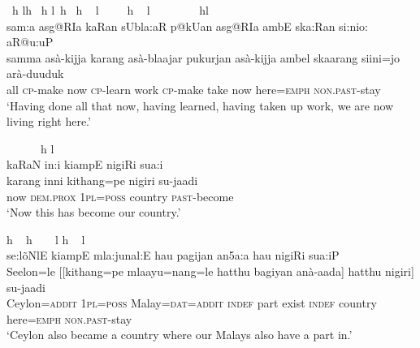 \ea \label{K051222nar04.23}
\gllll ~h \hspace{1.2cm}lh  ~h     \hspace{1cm}l~h ~h ~           l~~~~~h ~    \hspace{1cm}l ~~~~~~~~h\hspace{0.5cm}l \\
 sam:a asg@RI\texttoptiebar{\J\textctz}a kaRan sUbla:\J aR p@kU\J an asg@RI\J a ambE ska:Ran si:ni\J o:  aR@\dz u:\dz uP\\
 samma asà-kijja karang asà-blaajar pukurjan asà-kijja ambel skaarang siini=jo arà-duuduk\\
 all \textsc{cp}-make now \textsc{cp}-learn work \textsc{cp}-make take now    here=\textsc{emph} \textsc{non.past}-stay\\
`Having done all that now, having learned, having taken up work, we are now living right here.'\footnotemark
\z


\ea \label{K051222nar04.24}
\gllll ~ ~  ~             ~h     \hspace{1cm}l\\
 kaRaN in:i ki\dentt ampE nigiRi su\J a:\postalvd i\\
 karang inni kithang=pe nigiri su-jaadi\\
 now \textsc{dem.prox} \textsc{1pl}=\textsc{poss} country \textsc{past}-become\\
`Now this has become our country.'
\z


\ea \label{K051222nar04.25}
\gllll \hspace{1.1cm}h ~   \hspace{1.8cm}h ~         ~      \hspace{1.2cm}l \hspace{.6cm}h ~  \hspace{1.1cm}l           \\
 se:l\~oNlE ki\dentt ampE mla:junal:E ha\dentt u pagijan an5a:\dz a ha\dentt u nigiRi  su\J a:\postalvd iP\\
 Seelon=le [[kithang=pe mlaayu=nang=le hatthu bagiyan anà-aada] hatthu nigiri]\footnotemark{} su-jaadi\\
 Ceylon=\textsc{addit}  \textsc{1pl}=\textsc{poss} Malay=\textsc{dat}=\textsc{addit} \textsc{indef} part exist \textsc{indef} country here=\textsc{emph} \textsc{non.past}-stay\\
`Ceylon also became a country where our Malays also have a part in.'
\z
{}



